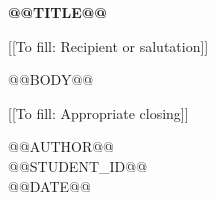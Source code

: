 \documentclass[12pt]{article}
\renewcommand{\missingfield}[1]{\textcolor{red!70!black}{[[To fill: #1]]}}
\begin{document}
\begin{center}{\Large\bfseries @@TITLE@@}\end{center}

\noindent\missingfield{Recipient or salutation}

@@BODY@@

\noindent\missingfield{Appropriate closing}

\noindent @@AUTHOR@@\\
@@STUDENT_ID@@\\
@@DATE@@
\end{document}
